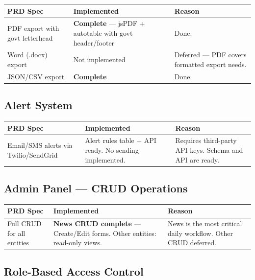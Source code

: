 \documentclass[12pt,a4paper]{article}
\begin{document}
\begin{center}
\begin{tabular}{p{4cm}p{4cm}p{5cm}}
\toprule
\textbf{PRD Spec} & \textbf{Implemented} & \textbf{Reason} \\
\midrule
PDF export with govt letterhead & \textcolor{greenok}{\textbf{Complete}} — jsPDF + autotable with govt header/footer & Done. \\
Word (.docx) export & Not implemented & Deferred — PDF covers formatted export needs. \\
JSON/CSV export & \textcolor{greenok}{\textbf{Complete}} & Done. \\
\bottomrule
\end{tabular}
\end{center}

\subsection{Alert System}

\begin{center}
\begin{tabular}{p{4cm}p{4cm}p{5cm}}
\toprule
\textbf{PRD Spec} & \textbf{Implemented} & \textbf{Reason} \\
\midrule
Email/SMS alerts via Twilio/SendGrid & Alert rules table + API ready. No sending implemented. & Requires third-party API keys. Schema and API are ready. \\
\bottomrule
\end{tabular}
\end{center}

\subsection{Admin Panel — CRUD Operations}

\begin{center}
\begin{tabular}{p{4cm}p{4cm}p{5cm}}
\toprule
\textbf{PRD Spec} & \textbf{Implemented} & \textbf{Reason} \\
\midrule
Full CRUD for all entities & \textcolor{greenok}{\textbf{News CRUD complete}} — Create/Edit forms. Other entities: read-only views. & News is the most critical daily workflow. Other CRUD deferred. \\
\bottomrule
\end{tabular}
\end{center}

\subsection{Role-Based Access Control}
\end{document}
